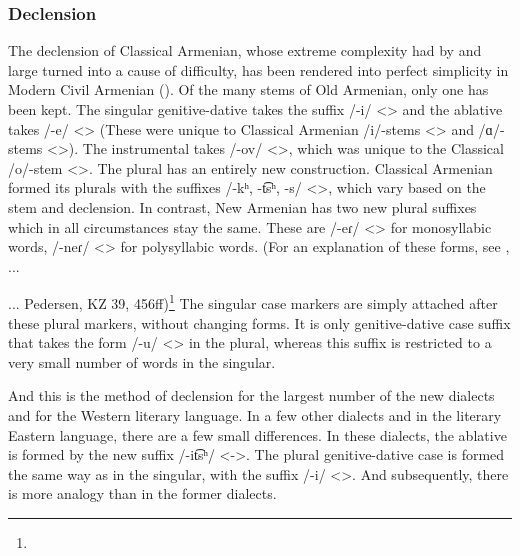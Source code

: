 
\subsubsection{Declension}


The declension of Classical Armenian, whose extreme complexity had by and large turned into a cause of difficulty, has been rendered into perfect simplicity in Modern Civil Armenian (). Of the many stems of Old Armenian, only one has been kept. The singular genitive-dative takes the suffix /-i/ <> and the ablative takes /-e/ <> (These were unique to Classical Armenian /i/-stems <> and /ɑ/-stems <>). The instrumental takes /-ov/ <>, which was unique to the Classical /o/-stem <>. The plural has an entirely new construction. Classical Armenian formed its plurals with the suffixes /-kʰ, -t͡sʰ, -s/ <>, which vary based on the stem and declension. In contrast, New Armenian has two new plural suffixes which in all circumstances stay the same. These are /-eɾ/ <> for monosyllabic words, /-neɾ/ <> for polysyllabic words. (For an explanation of these forms, see \citet[169]{Karst-1901-MiddleArmenain}, ... 



\begin{adjarianpage}\label{page:21}\end{adjarianpage}%

... Pedersen, KZ 39, 456ff)\footnote{} The singular case markers are simply attached after these plural markers, without changing forms. It is only genitive-dative case suffix that takes the form /-u/ <> in the plural, whereas this suffix is restricted to a very small number of words in the singular. 

And this is the method of declension for the largest number of the new dialects and for the Western literary language. In a few other dialects and in the literary Eastern language, there are a few small differences. In these dialects, the ablative is formed by the new suffix /-it͡sʰ/ <->. The plural genitive-dative case is formed the same way as in the singular, with the suffix /-i/ <>. And subsequently, there is more analogy than in the former dialects. 

